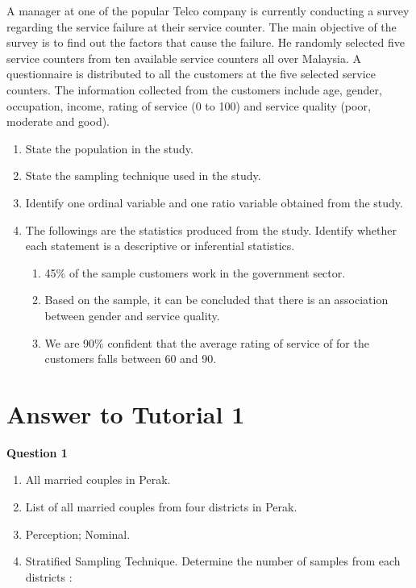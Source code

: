 \documentclass[
  a4paper,
  DIV=11,
  numbers=noendperiod,
  oneside]{scrreprt}
\providecommand{\tightlist}{%
  \setlength{\itemsep}{0pt}\setlength{\parskip}{0pt}}\usepackage{longtable,booktabs,array}
\begin{document}
A manager at one of the popular Telco company is currently conducting a
survey regarding the service failure at their service counter. The main
objective of the survey is to find out the factors that cause the
failure. He randomly selected five service counters from ten available
service counters all over Malaysia. A questionnaire is distributed to
all the customers at the five selected service counters. The information
collected from the customers include age, gender, occupation, income,
rating of service (0 to 100) and service quality (poor, moderate and
good).

\begin{enumerate}
\def\labelenumi{\alph{enumi})}
\item
  State the population in the study.
\item
  State the sampling technique used in the study.
\item
  Identify one ordinal variable and one ratio variable obtained from the
  study.
\item
  The followings are the statistics produced from the study. Identify
  whether each statement is a descriptive or inferential statistics.

  \begin{enumerate}
  \def\labelenumii{\roman{enumii})}
  \tightlist
  \item
    45\% of the sample customers work in the government sector.
  \item
    Based on the sample, it can be concluded that there is an
    association between gender and service quality.
  \item
    We are 90\% confident that the average rating of service of for the
    customers falls between 60 and 90.
  \end{enumerate}
\end{enumerate}

\hypertarget{answer-to-tutorial-1}{%
\section{Answer to Tutorial 1}\label{answer-to-tutorial-1}}

\textbf{Question 1}

\begin{enumerate}
\def\labelenumi{\alph{enumi})}
\tightlist
\item
  All married couples in Perak.
\item
  List of all married couples from four districts in Perak.
\item
  Perception; Nominal.
\item
  Stratified Sampling Technique. Determine the number of samples from
  each districts :
\end{enumerate}
\end{document}
